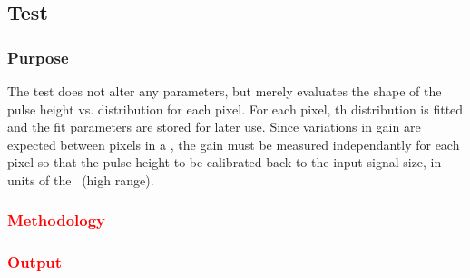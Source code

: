 
\subsection{\gainped Test}
\label{ss:gainped}

\subsubsection{Purpose}

The \gainped test does not alter any \dac parameters,
but merely evaluates the shape of the pulse height vs. \vcal distribution for each pixel.
For each pixel, th distribution is fitted and the fit parameters are stored for later use.
Since variations in gain are expected between pixels in a \roc,
the gain must be measured independantly for each pixel so that the pulse height to be calibrated back to the input signal size, 
in units of the \vcal~\dac (high range).

\subsubsection{\textcolor{red}{Methodology}}
\subsubsection{\textcolor{red}{Output}}

